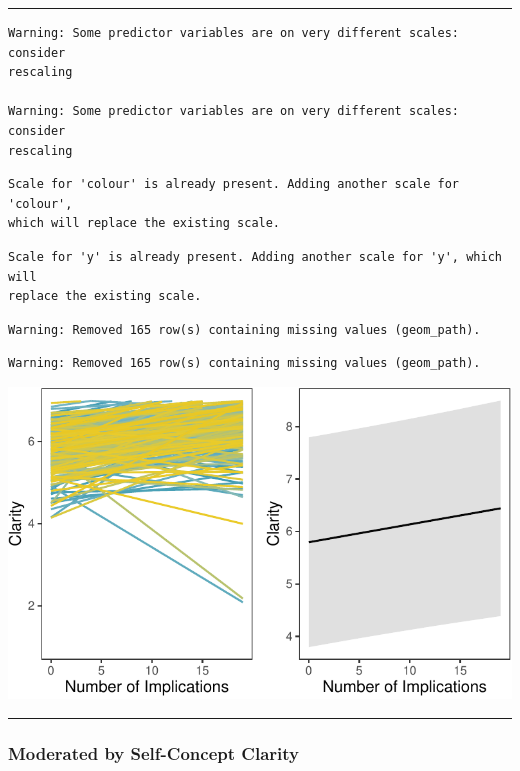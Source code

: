 \documentclass[
  .7em,
  letterpaper,
  DIV=11,
  numbers=noendperiod]{scrartcl}
\begin{document}
\begin{center}\rule{0.5\linewidth}{0.5pt}\end{center}

\begin{verbatim}
Warning: Some predictor variables are on very different scales: consider
rescaling

Warning: Some predictor variables are on very different scales: consider
rescaling
\end{verbatim}

\begin{verbatim}
Scale for 'colour' is already present. Adding another scale for 'colour',
which will replace the existing scale.
\end{verbatim}

\begin{verbatim}
Scale for 'y' is already present. Adding another scale for 'y', which will
replace the existing scale.
\end{verbatim}

\begin{verbatim}
Warning: Removed 165 row(s) containing missing values (geom_path).
\end{verbatim}

\begin{verbatim}
Warning: Removed 165 row(s) containing missing values (geom_path).
\end{verbatim}

\includegraphics{EpMemNet_LabPres_htmldoc_files/figure-pdf/unnamed-chunk-19-1.pdf}

\begin{center}\rule{0.5\linewidth}{0.5pt}\end{center}

\hypertarget{moderated-by-self-concept-clarity}{%
\subsubsection{Moderated by Self-Concept
Clarity}\label{moderated-by-self-concept-clarity}}
\end{document}

